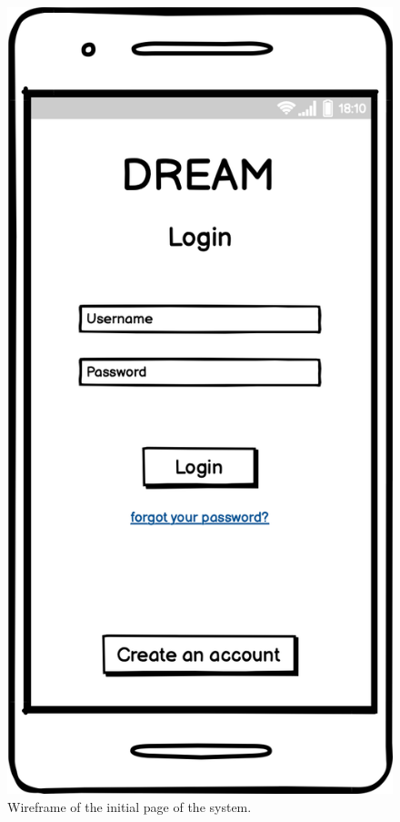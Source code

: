 \documentclass{article}
\begin{document}
\begin{figure}[H]
    \centering
    \includegraphics[scale=0.15]{wireframes/login.png}
    \caption{Wireframe of the initial page of the system.}
\end{figure}
\end{document}
